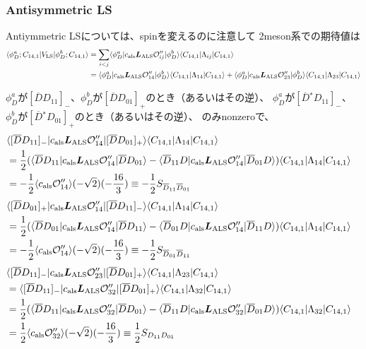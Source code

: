 \documentclass[a4j]{jarticle}
\def\bra{\langle}
\def\ket{\rangle}
\def\calO{{\cal O}}
\def\Dbar{\overline{{D}}{}}
\newcommand{\xbld}[1]{\mbox{\boldmath $#1$}}
\def\vecL{{\xbld{L}}}
\def\half#1{\text{${#1\over 2}$}}
\def\Vls{V_\text{LS}}
\def\Lals{{\vecL_\text{ALS}}}
\begin{document}
\subsubsection{Antisymmetric LS}

Antiymmetric LSについては、spinを変えるのに注意して
2meson系での期待値は
\begin{align}
\bra \phi_D^a;C_{14,1}|\Vls|\phi_D^b;C_{14,1}\ket
&=\sum_{i<j}\bra \phi_D^a|c_\text{als}\Lals\calO''_{ij}|\phi_D^b\ket
\bra C_{14,1}|\Lambda_{ij}|C_{14,1}\ket
\\
&=\bra \phi_D^a|c_\text{als}\Lals\calO''_{14}|\phi_D^b\ket\bra C_{14,1}|\Lambda_{14}|C_{14,1}\ket
 +\bra \phi_D^a|c_\text{als}\Lals\calO''_{23}|\phi_D^b\ket\bra C_{14,1}|\Lambda_{23}|C_{14,1}\ket
\end{align}

$\phi_D^a$が$[\Dbar D_{11}]_-$、$\phi_D^b$が$[\Dbar D_{01}]_+$のとき（あるいはその逆）、
$\phi_D^a$が$[\Dbar^* D_{11}]_-$、$\phi_D^b$が$[\Dbar^* D_{01}]_+$のとき（あるいはその逆）、
のみnonzeroで、
\begin{align}
\lefteqn{\bra [\Dbar D_{11}]_-|c_\text{als}\Lals\calO''_{14}|[\Dbar D_{01}]_+\ket\bra C_{14,1}|\Lambda_{14}|C_{14,1}\ket}
\nonumber\\
&=\half1
(\bra \Dbar D_{11}|c_\text{als}\Lals\calO''_{14}|\Dbar D_{01}\ket-\bra \Dbar_{11} D|c_\text{als}\Lals\calO''_{14}|\Dbar_{01} D\ket)\bra C_{14,1}|\Lambda_{14}|C_{14,1}\ket
\\
&=-\half1\bra c_\text{als}\calO''_{14}\ket(-\sqrt{2})(-{16\over 3}) \equiv -\half1 S_{\Dbar_{11}\Dbar_{01}}
\end{align}
\begin{align}
\lefteqn{\bra [\Dbar D_{01}]_+|c_\text{als}\Lals\calO''_{14}|[\Dbar D_{11}]_-\ket\bra C_{14,1}|\Lambda_{14}|C_{14,1}\ket}
\nonumber\\
&=\half1
(\bra \Dbar D_{01}|c_\text{als}\Lals\calO''_{14}|\Dbar D_{11}\ket-\bra \Dbar_{01} D|c_\text{als}\Lals\calO''_{14}|\Dbar_{11} D\ket)\bra C_{14,1}|\Lambda_{14}|C_{14,1}\ket
\\
&=-\half1\bra c_\text{als}\calO''_{14}\ket(-\sqrt{2})(-{16\over 3}) \equiv -\half1 S_{\Dbar_{01}\Dbar_{11}}
\end{align}
%
\begin{align}
\lefteqn{\bra [\Dbar D_{11}]_-|c_\text{als}\Lals\calO''_{23}|[\Dbar D_{01}]_+\ket\bra C_{14,1}|\Lambda_{23}|C_{14,1}\ket}
\nonumber\\
&=\lefteqn{\bra [\Dbar D_{11}]_-|c_\text{als}\Lals\calO''_{32}|[\Dbar D_{01}]_+\ket\bra C_{14,1}|\Lambda_{32}|C_{14,1}\ket}
\nonumber\\
&=\half1
(\bra \Dbar D_{11}|c_\text{als}\Lals\calO''_{32}|\Dbar D_{01}\ket-\bra \Dbar_{11} D|c_\text{als}\Lals\calO''_{32}|\Dbar_{01} D\ket)\bra C_{14,1}|\Lambda_{32}|C_{14,1}\ket
\\
&=\half1\bra c_\text{als}\calO''_{32}\ket(-\sqrt{2})(-{16\over 3}) \equiv \half1 S_{D_{11}D_{01}}
\end{align}
\end{document}
